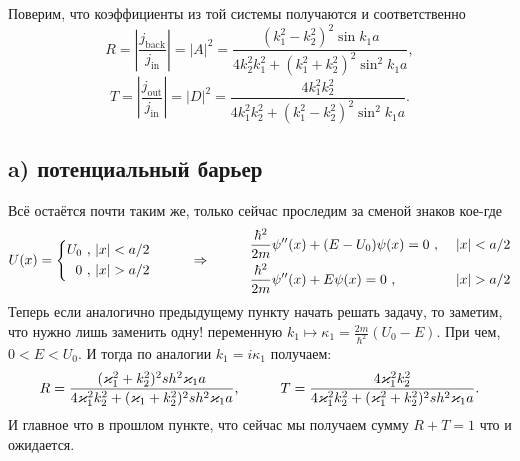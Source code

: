 Поверим, что коэффициенты из той системы получаются и соответственно 
\begin{equation*}
	R = \left| \frac{j_\text{back}}{j_\text{in}}\right| 
	= 
	|A|^2 
	= 
	\frac{(k_1^2 - k_2^2)^2 \sin k_1 a}{4 k_2^2 k_1^2 + (k_1^2 + k_2^2)^2 \sin^2 k_1 a},
\end{equation*}
\begin{equation*}
	T = \left| \frac{j_\text{out}}{j_\text{in}}\right|
	=
	|D|^2
	=
	\frac{4 k_1^2 k_2^2}{4 k_1^2 k_2^2 + (k_1^2 - k_2^2)^2 \sin^2 k_1 a}.
\end{equation*}

\subsection*{a) потенциальный барьер}
Всё остаётся почти таким же, только сейчас проследим за сменой знаков кое-где
\begin{equation*}
	U(x) = \left\{\begin{aligned}
		U_0 \ , \ &|x| < a/2\\
		0\ , \ &|x|>a/2
	\end{aligned}\right.
	\hspace{1 cm}
	\Rightarrow
	\hspace{1 cm}
	\begin{aligned}
		&\frac{\hbar^2}{2m} \psi''(x) + ( E - U_0) \psi(x) = 0 \ , \ &|x| < a/2\\
		&\frac{\hbar^2}{2m} \psi''(x) + E \psi(x) = 0 \ , \ &|x|>a/2
	\end{aligned}
\end{equation*}
Теперь если аналогично предыдущему пункту начать решать задачу, то заметим, что нужно лишь заменить одну! переменную $k_1 \mapsto \kappa_1 = \frac{2 m}{\hbar^2}(U_0 - E)$. При чем, $0 < E < U_0$. И тогда по аналогии $k_1 = i \kappa_1$ получаем:
\begin{equation*}
	R = \frac{(\kappa_1^2 + k_2^2)^2 sh^2 \kappa_1 a}{4 \kappa_1^2 k_2^2 + (\kappa_1 + k_2^2)^2 sh^2 \kappa_1 a},
	\hspace{1 cm}
	T = \frac{4 \kappa_1^2 k_2^2}{4 \kappa_1^2 k_2^2 + (\kappa_1^2 + k_2^2)^2 sh^2 \kappa_1 a}.
\end{equation*}
И главное что в прошлом пункте, что сейчас мы получаем сумму $R + T = 1$ что и ожидается.